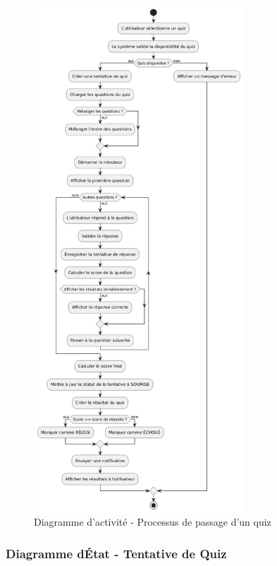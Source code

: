\documentclass[12pt,a4paper,twoside]{report}
\begin{document}
\begin{figure}[H]
\centering
\includegraphics[width=0.7\textwidth]{latex_media/media/image20.png}
\caption{Diagramme d'activité - Processus de passage d'un quiz}
\label{fig:diagramme-activite-quiz}
\end{figure}

\hypertarget{diagramme-duxe9tat---tentative-de-quiz}{%
\subsubsection{Diagramme d\textquotesingle État - Tentative de
Quiz}\label{diagramme-duxe9tat---tentative-de-quiz}}
\end{document}
